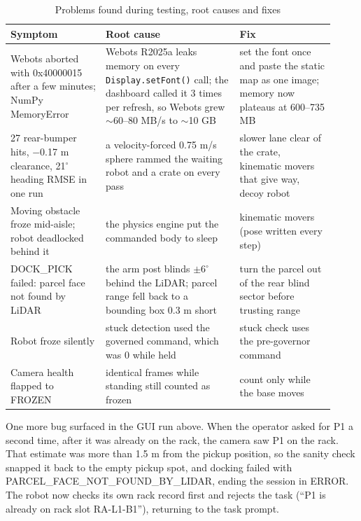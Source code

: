 \documentclass[conference]{IEEEtran}
\begin{document}
\begin{table}[!t]
\caption{Problems found during testing, root causes and fixes}
\centering
\footnotesize
\renewcommand{\arraystretch}{1.2}
\begin{tabular}{p{0.27\linewidth}p{0.38\linewidth}p{0.27\linewidth}}
\hline
\textbf{Symptom} & \textbf{Root cause} & \textbf{Fix} \\ \hline
Webots aborted with 0x40000015 after a few minutes; NumPy MemoryError & Webots R2025a leaks memory on every \texttt{Display.setFont()} call; the dashboard called it 3 times per refresh, so Webots grew $\sim$60--80 MB/s to $\sim$10 GB & set the font once and paste the static map as one image; memory now plateaus at 600--735 MB \\
27 rear-bumper hits, $-$0.17 m clearance, 21$^\circ$ heading RMSE in one run & a velocity-forced 0.75 m/s sphere rammed the waiting robot and a crate on every pass & slower lane clear of the crate, kinematic movers that give way, decoy robot \\
Moving obstacle froze mid-aisle; robot deadlocked behind it & the physics engine put the commanded body to sleep & kinematic movers (pose written every step) \\
DOCK\_PICK failed: parcel face not found by LiDAR & the arm post blinds $\pm6^\circ$ behind the LiDAR; parcel range fell back to a bounding box 0.3 m short & turn the parcel out of the rear blind sector before trusting range \\
Robot froze silently & stuck detection used the governed command, which was 0 while held & stuck check uses the pre-governor command \\
Camera health flapped to FROZEN & identical frames while standing still counted as frozen & count only while the base moves \\
\hline
\end{tabular}
\end{table}
One more bug surfaced in the GUI run above. When the operator asked for P1 a second time, after it was already on the rack, the camera saw P1 on the rack. That estimate was more than 1.5 m from the pickup position, so the sanity check snapped it back to the empty pickup spot, and docking failed with PARCEL\_FACE\_NOT\_FOUND\_BY\_LIDAR, ending the session in ERROR. The robot now checks its own rack record first and rejects the task (``P1 is already on rack slot RA-L1-B1''), returning to the task prompt.
\end{document}
